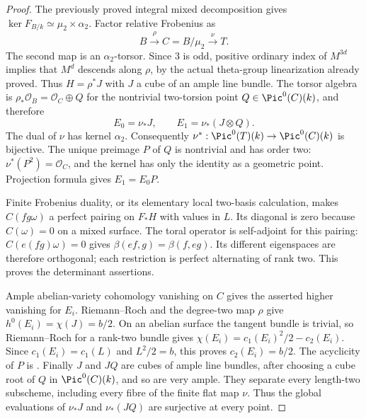 \begin{proof}
The previously proved integral mixed decomposition gives
$\ker F_{B/k}\simeq\mu_2\times\alpha_2$.
Factor relative Frobenius as
\[
 B\xrightarrow{\rho}C=B/\mu_2\xrightarrow{\nu}T.
\]
The second map is an $\alpha_2$-torsor.
Since $3$ is odd, positive ordinary index of $M^{3d}$ implies
that $M^d$ descends along $\rho$, by the actual theta-group
linearization already proved. Thus $H=\rho^*J$ with $J$ a
cube of an ample line bundle. The torsor algebra is
$\rho_*\mathcal O_B=\mathcal O_C\oplus Q$ for the nontrivial
two-torsion point $Q\in\Pic^0(C)(k)$, and therefore
\[
 E_0=\nu_*J,\qquad E_1=\nu_*(J\otimes Q).
\]
The dual of $\nu$ has kernel $\alpha_2$. Consequently
$\nu^*: \Pic^0(T)(k)\to\Pic^0(C)(k)$ is bijective.
The unique preimage $P$ of $Q$ is nontrivial and has order two:
$\nu^*(P^2)=\mathcal O_C$, and the kernel has only the identity
as a geometric point. Projection formula gives $E_1=E_0P$.

Finite Frobenius duality, or its elementary local two-basis
calculation, makes $C(fg\omega)$ a perfect pairing on $F_*H$
with values in $L$. Its diagonal is zero because
$C(\omega)=0$ on a mixed surface.
The toral operator is self-adjoint for this pairing:
$C(e(fg)\omega)=0$ gives $\beta(ef,g)=\beta(f,eg)$.
Its different eigenspaces are therefore orthogonal; each
restriction is perfect alternating of rank two. This proves
the determinant assertions.

Ample abelian-variety cohomology vanishing on $C$ gives the
asserted higher vanishing for $E_i$. Riemann--Roch and the
degree-two map $\rho$ give $h^0(E_i)=\chi(J)=b/2$.
On an abelian surface the tangent bundle is trivial, so
Riemann--Roch for a rank-two bundle gives
$\chi(E_i)=c_1(E_i)^2/2-c_2(E_i)$. Since $c_1(E_i)=c_1(L)$
and $L^2/2=b$, this proves $c_2(E_i)=b/2$.
The acyclicity of $P$ is
\cite[Lemma~7.19 and its full proof, p.~105]
{EdixhovenVanDerGeerMoonenAV}.
Finally $J$ and $JQ$ are cubes of ample line bundles, after
choosing a cube root of $Q$ in $\Pic^0(C)(k)$, and so are
very ample. They separate every length-two subscheme,
including every fibre of the finite flat map $\nu$.
Thus the global evaluations of $\nu_*J$ and $\nu_*(JQ)$
are surjective at every point.
\end{proof}

